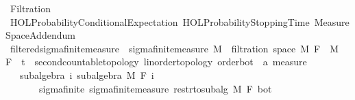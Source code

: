 %
\begin{isabellebody}%
%
%
\isadelimtheory
%
\endisadelimtheory
%
\isatagtheory
{}\isamarkupfalse%
\ Filtration\isanewline
{}\ {\isachardoublequoteopen}HOL{\isacharminus}{\kern0pt}Probability{\isachardot}{\kern0pt}Conditional{\isacharunderscore}{\kern0pt}Expectation{\isachardoublequoteclose}\ {\isachardoublequoteopen}HOL{\isacharminus}{\kern0pt}Probability{\isachardot}{\kern0pt}Stopping{\isacharunderscore}{\kern0pt}Time{\isachardoublequoteclose}\ Measure{\isacharunderscore}{\kern0pt}Space{\isacharunderscore}{\kern0pt}Addendum\isanewline
{}%
\endisatagtheory
{\isafoldtheory}%
%
\isadelimtheory
%
\endisadelimtheory
%
\isadelimdocument
%
\endisadelimdocument
%
\isatagdocument
%
\isamarkuptrue%
%
\endisatagdocument
{\isafolddocument}%
%
\isadelimdocument
%
\endisadelimdocument
{}\isamarkupfalse%
\ filtered{\isacharunderscore}{\kern0pt}sigma{\isacharunderscore}{\kern0pt}finite{\isacharunderscore}{\kern0pt}measure\ {\isacharequal}{\kern0pt}\ sigma{\isacharunderscore}{\kern0pt}finite{\isacharunderscore}{\kern0pt}measure\ M\ {\isacharplus}{\kern0pt}\ filtration\ {\isachardoublequoteopen}space\ M{\isachardoublequoteclose}\ F\ \ M\ \ F\ {\isacharcolon}{\kern0pt}{\isacharcolon}{\kern0pt}\ {\isachardoublequoteopen}{\isacharprime}{\kern0pt}t\ {\isacharcolon}{\kern0pt}{\isacharcolon}{\kern0pt}\ {\isacharbraceleft}{\kern0pt}second{\isacharunderscore}{\kern0pt}countable{\isacharunderscore}{\kern0pt}topology{\isacharcomma}{\kern0pt}\ linorder{\isacharunderscore}{\kern0pt}topology{\isacharcomma}{\kern0pt}\ order{\isacharunderscore}{\kern0pt}bot{\isacharbraceright}{\kern0pt}\ {\isasymRightarrow}\ {\isacharprime}{\kern0pt}a\ measure{\isachardoublequoteclose}\ {\isacharplus}{\kern0pt}\isanewline
\ \ \ subalgebra{\isacharcolon}{\kern0pt}\ {\isachardoublequoteopen}{\isasymAnd}i{\isachardot}{\kern0pt}\ subalgebra\ M\ {\isacharparenleft}{\kern0pt}F\ i{\isacharparenright}{\kern0pt}{\isachardoublequoteclose}\isanewline
\ \ \ \ \ \ \ sigma{\isacharunderscore}{\kern0pt}finite{\isacharcolon}{\kern0pt}\ {\isachardoublequoteopen}sigma{\isacharunderscore}{\kern0pt}finite{\isacharunderscore}{\kern0pt}measure\ {\isacharparenleft}{\kern0pt}restr{\isacharunderscore}{\kern0pt}to{\isacharunderscore}{\kern0pt}subalg\ M\ {\isacharparenleft}{\kern0pt}F\ bot{\isacharparenright}{\kern0pt}{\isacharparenright}{\kern0pt}{\isachardoublequoteclose}\isanewline

\end{isabellebody}
